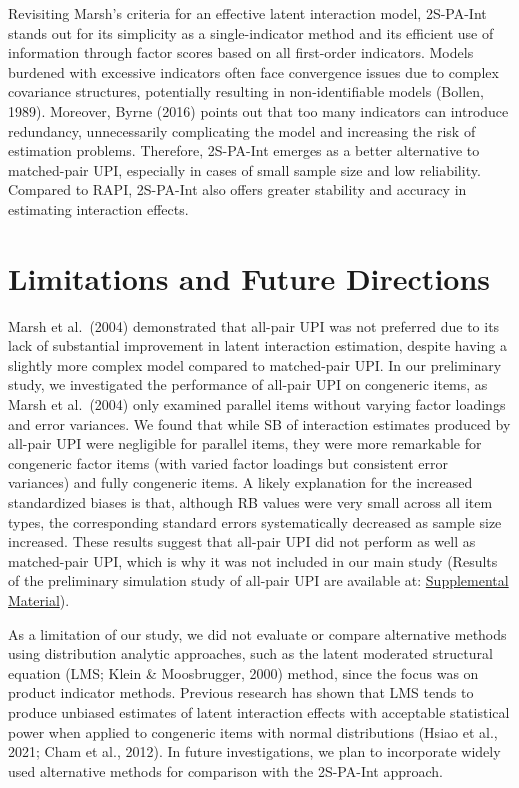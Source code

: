 \documentclass[
  man]{apa6}
\begin{document}
Revisiting Marsh's criteria for an effective latent interaction model, 2S-PA-Int stands out for its simplicity as a single-indicator method and its efficient use of information through factor scores based on all first-order indicators. Models burdened with excessive indicators often face convergence issues due to complex covariance structures, potentially resulting in non-identifiable models (Bollen, 1989). Moreover, Byrne (2016) points out that too many indicators can introduce redundancy, unnecessarily complicating the model and increasing the risk of estimation problems. Therefore, 2S-PA-Int emerges as a better alternative to matched-pair UPI, especially in cases of small sample size and low reliability. Compared to RAPI, 2S-PA-Int also offers greater stability and accuracy in estimating interaction effects.

\section{Limitations and Future Directions}\label{limitations-and-future-directions}

Marsh et al.~(2004) demonstrated that all-pair UPI was not preferred due to its lack of substantial improvement in latent interaction estimation, despite having a slightly more complex model compared to matched-pair UPI. In our preliminary study, we investigated the performance of all-pair UPI on congeneric items, as Marsh et al.~(2004) only examined parallel items without varying factor loadings and error variances. We found that while SB of interaction estimates produced by all-pair UPI were negligible for parallel items, they were more remarkable for congeneric factor items (with varied factor loadings but consistent error variances) and fully congeneric items. A likely explanation for the increased standardized biases is that, although RB values were very small across all item types, the corresponding standard errors systematically decreased as sample size increased. These results suggest that all-pair UPI did not perform as well as matched-pair UPI, which is why it was not included in our main study (Results of the preliminary simulation study of all-pair UPI are available at: \href{https://github.com/Gengrui-Zhang/2S-PA-Int/blob/main/Qual_1_Supplemental_Material/Supplemental-Material.pdf}{Supplemental Material}).

As a limitation of our study, we did not evaluate or compare alternative methods using distribution analytic approaches, such as the latent moderated structural equation (LMS; Klein \& Moosbrugger, 2000) method, since the focus was on product indicator methods. Previous research has shown that LMS tends to produce unbiased estimates of latent interaction effects with acceptable statistical power when applied to congeneric items with normal distributions (Hsiao et al., 2021; Cham et al., 2012). In future investigations, we plan to incorporate widely used alternative methods for comparison with the 2S-PA-Int approach.
\end{document}
